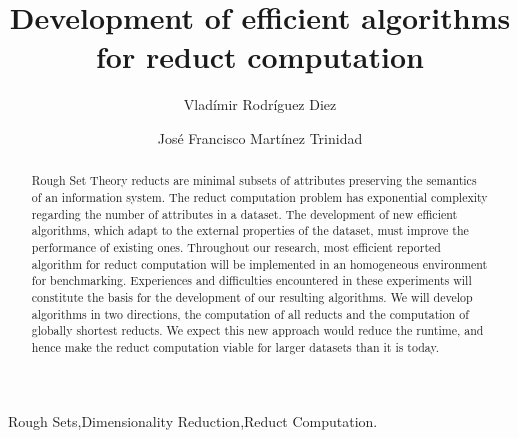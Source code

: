 \documentclass[authoryear,11pt]{elsarticle}
\begin{document}
\begin{frontmatter}
	
	\title{Development of efficient algorithms for reduct computation}
	
	\author{Vlad\'imir Rodr\'iguez Diez}
	\author{Jos\'e Francisco Mart\'inez Trinidad}
	
	\address{Computer Science Department\\National Institute of
	Astrophysics, Optics and Electronics\\
	Luis Enrique Erro \# 1, Santa Mar\'{\i}a Tonantzintla, Puebla,
	72840, M\'{e}xico} 
	
	
	
	\begin{abstract}
	    Rough Set Theory reducts are minimal subsets of attributes preserving the semantics of an 
	    information system. The reduct computation problem has exponential complexity regarding the number of 
	    attributes in a dataset. The development of new efficient algorithms, which adapt to the external
	    properties of the dataset, must improve the performance of existing ones. 
	    Throughout our research, most efficient reported algorithm for reduct computation will be 
	    implemented in an homogeneous environment for benchmarking. Experiences and difficulties 
	    encountered in these experiments will constitute the basis for the development of our resulting algorithms. 
	    We will develop algorithms in two directions, the computation of all reducts and the computation of
	    globally shortest reducts.
	    We expect this new approach would reduce the runtime, and hence make the reduct computation viable for 
	    larger datasets than it is today.
	\end{abstract}
	
	\begin{keyword}
		Rough Sets\sep Dimensionality Reduction\sep Reduct Computation.
	\end{keyword}
	
\end{frontmatter}

\pagebreak 
\tableofcontents
\pagebreak 

\end{document}
